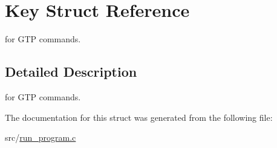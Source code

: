 \hypertarget{struct_key}{
\section{Key Struct Reference}
\label{struct_key}
}


for GTP commands.  




\subsection{Detailed Description}
for GTP commands. 

The documentation for this struct was generated from the following file:\begin{DoxyCompactItemize}
\item 
src/\hyperlink{run__program_8c}{run\_\-program.c}\end{DoxyCompactItemize}
